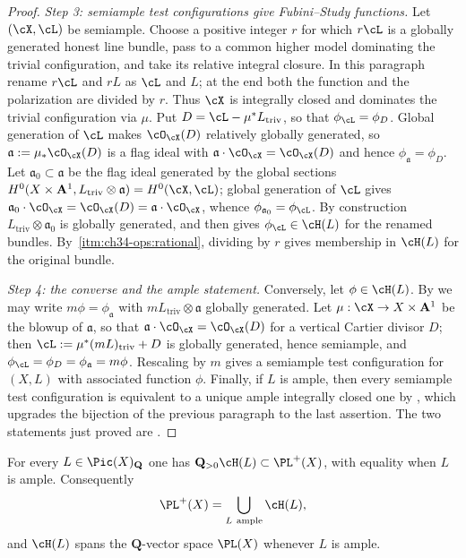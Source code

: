 \begin{proof}
\emph{Step 3: semiample test configurations give Fubini--Study functions.}
Let $(\cX,\cL)$ be semiample.  Choose a positive integer $r$ for
which $r\cL$ is a globally generated honest line bundle, pass to a common
higher model dominating the trivial configuration, and take its relative
integral closure.  In this paragraph rename $r\cL$ and $rL$ as $\cL$
and $L$; at the end both the function and the polarization are divided
by $r$.  Thus $\cX$ is integrally closed and dominates the trivial
configuration via $\mu$.  Put $D=\cL-\mu^*L_{\mathrm{triv}}$, so
that $\phi_{\cL}=\phi_D$.  Global generation of $\cL$ makes
$\cO_{\cX}(D)$ relatively globally generated, so
$\mathfrak a:=\mu_*\cO_{\cX}(D)$ is a flag ideal with
$\mathfrak a\cdot\cO_{\cX}=\cO_{\cX}(D)$ and hence
$\phi_{\mathfrak a}=\phi_D$.  Let $\mathfrak a_0\subset\mathfrak a$ be
the flag ideal generated by the global sections
$H^0(X\times\mathbf A^1,L_{\mathrm{triv}}\otimes\mathfrak a)
=H^0(\cX,\cL)$; global generation of $\cL$ gives
$\mathfrak a_0\cdot\cO_{\cX}=\cO_{\cX}(D)=\mathfrak a\cdot\cO_{\cX}$,
whence $\phi_{\mathfrak a_0}=\phi_{\cL}$.  By construction
$L_{\mathrm{triv}}\otimes\mathfrak a_0$ is globally generated, and
 then gives
$\phi_{\cL}\in\cH(L)$ for the renamed bundles.
By \,\cref{itm:ch34-ops:rational},
dividing by $r$ gives membership in $\cH(L)$ for the original bundle.

\emph{Step 4: the converse and the ample statement.}  Conversely, let
$\phi\in\cH(L)$.  By  we may write
$m\phi=\phi_{\mathfrak a}$ with $mL_{\mathrm{triv}}\otimes\mathfrak a$
globally generated.  Let $\mu:\cX\to X\times\mathbf A^1$ be the blowup of
$\mathfrak a$, so that $\mathfrak a\cdot\cO_{\cX}=\cO_{\cX}(D)$ for a
vertical Cartier divisor $D$; then
$\cL:=\mu^*(mL)_{\mathrm{triv}}+D$ is globally generated, hence semiample,
and $\phi_{\cL}=\phi_D=\phi_{\mathfrak a}=m\phi$.  Rescaling by $m$
gives a semiample test configuration for $(X,L)$ with associated function
$\phi$.  Finally, if $L$ is ample, then every semiample test
configuration is equivalent to a unique ample integrally closed one by
\cite[Proposition~2.30]{BJ22}, which upgrades the bijection of the previous
paragraph to the last assertion.  The two statements just proved are
\cite[Theorem~2.31 and Corollary~2.32]{BJ22}.
\end{proof}

\begin{corollary}
\label{cor:ch34-pl-plus-union}
For every $L\in\Pic(X)_{\mathbf Q}$ one has
$\mathbf Q_{>0}\cH(L)\subset\PL^+(X)$, with equality when $L$ is ample.
Consequently
\begin{equation}
\label{eq:ch34-pl-plus-union}
 \PL^+(X)=\bigcup_{L\ \text{ample}}\cH(L),
\end{equation}
and $\cH(L)$ spans the $\mathbf Q$-vector space $\PL(X)$ whenever
$L$ is ample.
\end{corollary}

